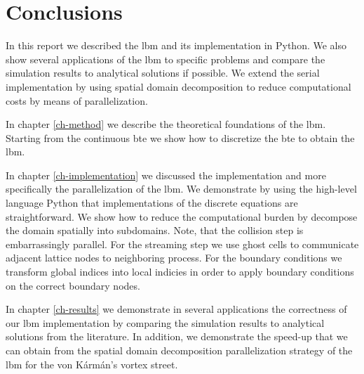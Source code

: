 \documentclass[a4paper,11pt, footsepline]{book}
\begin{document}
\chapter{Conclusions}\label{ch-conclusion}
In this report we described the \ac{lbm} and its implementation in Python. We also show several applications of the \ac{lbm} to specific problems and compare the simulation results to analytical solutions if possible. We extend the serial implementation by using spatial domain decomposition to reduce computational costs by means of parallelization.

In chapter \ref{ch-method} we describe the theoretical foundations of the \ac{lbm}. Starting from the continuous \ac{bte} we show how to discretize the \ac{bte} to obtain the \ac{lbm}.

In chapter \ref{ch-implementation} we discussed the implementation and more specifically the parallelization of the \ac{lbm}. We demonstrate by using the high-level language Python that implementations of the discrete equations are straightforward. We show how to reduce the computational burden by decompose the domain spatially into subdomains. Note, that the collision step is embarrassingly parallel. For the streaming step we use ghost cells to communicate adjacent lattice nodes to neighboring process. For the boundary conditions we transform global indices into local indicies in order to apply boundary conditions on the correct boundary nodes.

In chapter \ref{ch-results} we demonstrate in several applications the correctness of our \ac{lbm} implementation by comparing the simulation results to analytical solutions from the literature. In addition, we demonstrate the speed-up that we can obtain from the spatial domain decomposition parallelization strategy of the \ac{lbm} for the von K\'{a}rm\'{a}n's vortex street.

\newpage



\end{document}
